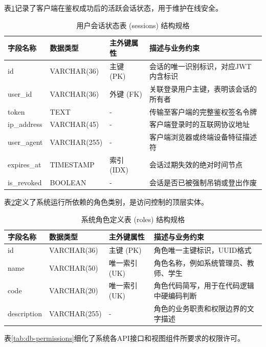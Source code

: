 表\ref{tab:db-sessions}记录了客户端在鉴权成功后的活跃会话状态，用于维护在线安全。

\begin{table}[H]
\centering
\caption{用户会话状态表 (sessions) 结构规格}
\label{tab:db-sessions}
\begin{tabularx}{\textwidth}{lllX}
\toprule
字段名称 & 数据类型 & 主外键属性 & 描述与业务约束 \\
\midrule
id & VARCHAR(36) & 主键 (PK) & 会话的唯一识别标识，对应JWT内含标识 \\
user\_id & VARCHAR(36) & 外键 (FK) & 关联登录用户主键，表明该会话的所有者 \\
token & TEXT & - & 传输至客户端的完整鉴权签名令牌 \\
ip\_address & VARCHAR(45) & - & 客户端登录时的互联网协议地址 \\
user\_agent & VARCHAR(255) & - & 客户端浏览器或终端设备特征描述符 \\
expires\_at & TIMESTAMP & 索引 (IDX) & 会话过期失效的绝对时间节点 \\
is\_revoked & BOOLEAN & - & 会话是否已被强制吊销或登出作废 \\
\bottomrule
\end{tabularx}
\end{table}

表\ref{tab:db-roles}定义了系统运行所依赖的角色类别，是访问控制的顶层实体。

\begin{table}[H]
\centering
\caption{系统角色定义表 (roles) 结构规格}
\label{tab:db-roles}
\begin{tabularx}{\textwidth}{lllX}
\toprule
字段名称 & 数据类型 & 主外键属性 & 描述与业务约束 \\
\midrule
id & VARCHAR(36) & 主键 (PK) & 角色唯一主键标识，UUID格式 \\
name & VARCHAR(50) & 唯一索引 (UK) & 角色名称，例如系统管理员、教师、学生 \\
code & VARCHAR(20) & 唯一索引 (UK) & 角色代码简写，用于在代码逻辑中硬编码判断 \\
description & VARCHAR(255) & - & 角色的业务职责和权限边界的文字描述 \\
\bottomrule
\end{tabularx}
\end{table}

表\ref{tab:db-permissions}细化了系统各API接口和视图组件所要求的权限许可。

